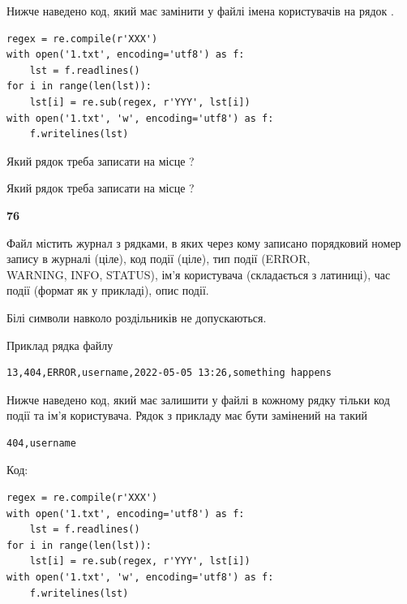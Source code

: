Нижче наведено код, який має замінити у файлі імена користувачів на рядок .



\begin{verbatim}
regex = re.compile(r'XXX')
with open('1.txt', encoding='utf8') as f:
    lst = f.readlines()
for i in range(len(lst)):
    lst[i] = re.sub(regex, r'YYY', lst[i])
with open('1.txt', 'w', encoding='utf8') as f:
    f.writelines(lst)
\end{verbatim}







Який рядок треба записати на місце  ?\par
\vspace{5mm}


Який рядок треба записати на місце  ?\par


\newpage

{\begin {center}\textbf{ 76}\end {center}}\par
Файл  містить журнал з рядками, в яких через кому записано поряд\-ко\-вий номер запису в журналі (ціле), код події (ціле), тип події (ERROR, \\WARNING, INFO, STATUS), ім'я користувача (складається з латиниці), час події (фор\-мат як у прикладі), опис події.

Білі символи навколо роздільників не допускаються.

Приклад рядка файлу



\begin{verbatim}
13,404,ERROR,username,2022-05-05 13:26,something happens
\end{verbatim}


Нижче наведено код, який має залишити у файлі в кожному рядку тільки код події та ім'я користувача. Рядок з прикладу має бути замінений на такий



\begin{verbatim}
404,username
\end{verbatim}




Код:



\begin{verbatim}
regex = re.compile(r'XXX')
with open('1.txt', encoding='utf8') as f:
    lst = f.readlines()
for i in range(len(lst)):
    lst[i] = re.sub(regex, r'YYY', lst[i])
with open('1.txt', 'w', encoding='utf8') as f:
    f.writelines(lst)
\end{verbatim}








